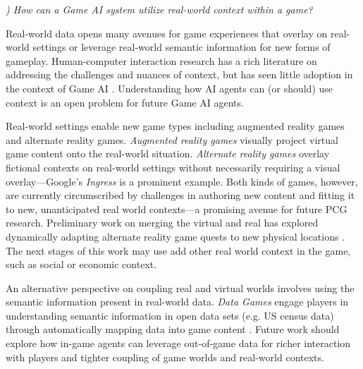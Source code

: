 \documentclass[conference]{IEEEtran}
\newcounter{questionno}
\newcommand{\subsubsectionx}[1]{{\em {\arabic{questionno}) #1}}
	\addtocounter{questionno}{1}
	}
\begin{document}
\subsubsectionx{How can a Game AI system utilize real-world context within a game?}
%
Real-world data opens many avenues for game experiences that overlay on real-world settings or leverage real-world semantic information for new forms of gameplay. 
Human-computer interaction research has a rich literature on addressing the challenges and nuances of context, but has seen little adoption in the context of Game AI \cite{hong2009:context-aware-computing}. 
Understanding how AI agents can (or should) use context is an open problem for future Game AI agents.

Real-world settings enable new game types including augmented reality games and alternate reality games. 
{\em Augmented reality games} visually project virtual game content onto the real-world situation.
{\em Alternate reality games} overlay fictional contexts on real-world settings without necessarily requiring a visual overlay---Google's \textit{Ingress} is a prominent example. 
Both kinds of games, however, are currently circumscribed by challenges in authoring new content and fitting it to new, unanticipated real world contexts---a promising avenue for future PCG research. 
Preliminary work on merging the virtual and real has explored dynamically adapting alternate reality game quests to new physical locations \cite{macvean2011:wequest, gustafsson2006:backseatplayground}.
The next stages of this work may use add other real world context in the game, such as social or economic context.

An alternative perspective on coupling real and virtual worlds involves using the semantic information present in real-world data. 
{\em Data Games} engage players in understanding semantic information in open data sets (e.g. US census data) through automatically mapping data into game content \cite{friberger2013:datagames}. 
Future work should explore how in-game agents can leverage out-of-game data for richer interaction with players and tighter coupling of game worlds and real-world contexts.
\end{document}
